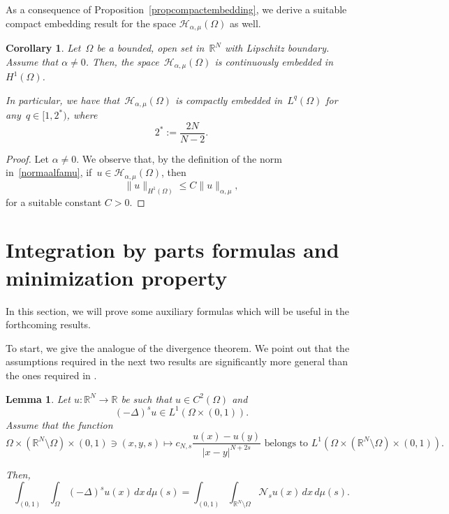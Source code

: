 \documentclass[12pt,a4paper,intlimits,sumlimits]{amsart}
\def \R {\mathbb{R}}
\def \Ns {\mathscr{N}_{s}}
\theoremstyle{definition}
\theoremstyle{plain}
\newtheorem{lemma}[definition]{Lemma}
\newtheorem{corollary}[definition]{Corollary}
\numberwithin{equation}{section}
\renewcommand{\le}{\leqslant}
\begin{document}
As a consequence of Proposition~\ref{propcompactembedding}, we derive a suitable compact embedding result for the space $\mathcal H_{\alpha, \mu}(\Omega)$ as well.

\begin{corollary}\label{IMMERSIONEALPHAMU}
Let~$\Omega$ be a bounded, open set in~$\R^N$ with Lipschitz boundary.
Assume that $\alpha\neq 0$. Then, the space~$\mathcal H_{\alpha, \mu}(\Omega)$ is continuously embedded in~$H^1(\Omega)$. 

In particular, we have that~$\mathcal H_{\alpha, \mu}(\Omega)$ is compactly embedded in~$L^q(\Omega)$ for any~$q\in [1,2^*)$, where
\[
2^*:=\frac{2N}{N-2}.
\]
\end{corollary}

\begin{proof}
Let $\alpha\neq 0$. We observe that, by the definition of the norm
in~\eqref{normaalfamu}, if~$u\in\mathcal H_{\alpha, \mu}(\Omega)$, then
\[
\|u\|_{H^1(\Omega)} \le C \|u\|_{\alpha, \mu},
\]
for a suitable constant $C>0$.
\end{proof}

\section{Integration by parts formulas and minimization property}\label{JOSDNKDJO-1}

In this section, we will prove some auxiliary formulas which will be useful in the forthcoming results. 

To start, we give the analogue of the divergence theorem. We point out that the assumptions required in the next two results are significantly more general than the ones required in \cite[Lemma 3.2 and Lemma 3.3]{MR3651008}.

\begin{lemma}\label{lemmathdivergenza}
Let $u:\R^N\to \R$ 
be such that $u\in C^2(\Omega)$ and 
\begin{equation}\label{ipotesidivergenza1}
(-\Delta)^su \in L^1(\Omega \times (0,1)).
\end{equation}
Assume that the function
\begin{equation}\label{ipotesidivergenza2}
\Omega\times(\R^N\setminus \Omega)\times (0,1)\ni (x,y,s)
\mapsto c_{N,s}\frac{u(x)-u(y)}{|x-y|^{N+2s}}
\mbox{ belongs to }
L^1(\Omega \times(\R^N\setminus \Omega) \times (0,1)).
\end{equation}

Then,
\begin{equation}\label{tesidivergenza}
\int_{(0, 1)}\int_\Omega (-\Delta)^su(x)\,dx\,d\mu(s)
=\int_{(0, 1)}\int_{\R^N\setminus \Omega}\Ns u(x)\,dx\,d\mu(s).
\end{equation}
\end{lemma}
\end{document}
